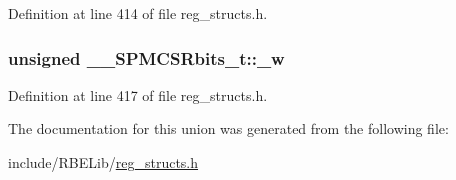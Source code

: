 Definition at line 414 of file reg\+\_\+structs.\+h.

\hypertarget{union_____s_p_m_c_s_rbits__t_a07bf1fbc0f20f7171cb4b032563ae209}{
\subsubsection[{\+\_\+w}]{\setlength{\rightskip}{0pt plus 5cm}unsigned \+\_\+\+\_\+\+S\+P\+M\+C\+S\+Rbits\+\_\+t\+::\+\_\+w}}\label{union_____s_p_m_c_s_rbits__t_a07bf1fbc0f20f7171cb4b032563ae209}


Definition at line 417 of file reg\+\_\+structs.\+h.



The documentation for this union was generated from the following file\+:\begin{DoxyCompactItemize}
\item 
include/\+R\+B\+E\+Lib/\hyperlink{reg__structs_8h}{reg\+\_\+structs.\+h}\end{DoxyCompactItemize}
